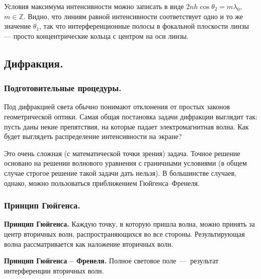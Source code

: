 \documentclass[11pt,a4paper]{article}
\numberwithin{equation}{section}
\begin{document}
\begin{center}
\end{center}

Условия максимума интенсивности можно записать в виде $2nh \cos
\theta_2 = m \lambda_0$, $m \in \mathbb{Z}$. Видно, что линиям равной
интенсивности соответствует одно и то же значение $\theta_1$, так что
интерференционные полосы в фокальной плоскости линзы --- просто
концентрические кольца с центром на оси линзы.

\subsection{Дифракция.}
\label{sec:difraction}
\subsubsection{Подготовительные процедуры.}
\label{sec:difraction_intro}

Под дифракцией света обычно понимают отклонения от простых законов
геометрической оптики. Самая общая постановка задачи дифракции
выглядит так: пусть даны некие препятствия, на которые падает
электромагнитная волна. Как будет выглядеть распределение
интенсивности на экране?

Это очень сложная (с математической точки зрения) задача. Точное
решение основано на решении волнового уравнения с граничными условиями
(в общем случае строгое решение такой задачи дать нельзя). В
большинстве случаев, однако, можно пользоваться приближением Гюйгенса--Френеля.

\subsubsection{Принцип Гюйгенса.}
\label{sec:huygens}

\textbf{Принцип Гюйгенса.} Каждую точку, в которую пришла волна, можно принять за центр вторичных волн, распространяющихся во все стороны. Результирующая волна рассматривается как наложение вторичных волн.

\textbf{Принцип Гюйгенса -- Френеля.} Полное световое поле~---~результат интерференции вторичных волн.
\end{document}
